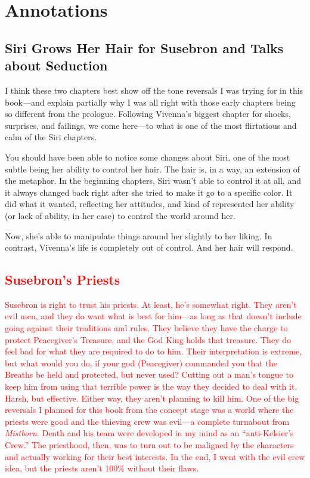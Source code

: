\section*{Annotations}

\subsection*{Siri Grows Her Hair for Susebron and Talks about Seduction}

I think these two chapters best show off the tone reversals I was trying for in this book—and explain partially why I was all right with those early chapters being so different from the prologue. Following Vivenna’s biggest chapter for shocks, surprises, and failings, we come here—to what is one of the most flirtatious and calm of the Siri chapters.

You should have been able to notice some changes about Siri, one of the most subtle being her ability to control her hair. The hair is, in a way, an extension of the metaphor. In the beginning chapters, Siri wasn’t able to control it at all, and it always changed back right after she tried to make it go to a specific color. It did what it wanted, reflecting her attitudes, and kind of represented her ability (or lack of ability, in her case) to control the world around her.

Now, she’s able to manipulate things around her slightly to her liking. In contrast, Vivenna’s life is completely out of control. And her hair will respond.

\textcolor{red}{
\subsection*{Susebron’s Priests}
}
\textcolor{red}{
Susebron is right to trust his priests. At least, he’s somewhat right. They aren’t evil men, and they do want what is best for him—as long as that doesn’t include going against their traditions and rules. They believe they have the charge to protect Peacegiver’s Treasure, and the God King holds that treasure. They do feel bad for what they are required to do to him.
}
\textcolor{red}{
Their interpretation is extreme, but what would you do, if your god (Peacegiver) commanded you that the Breaths be held and protected, but never used? Cutting out a man’s tongue to keep him from using that terrible power is the way they decided to deal with it. Harsh, but effective.
}
\textcolor{red}{
Either way, they aren’t planning to kill him. One of the big reversals I planned for this book from the concept stage was a world where the priests were good and the thieving crew was evil—a complete turnabout from \textit{Mistborn}. Denth and his team were developed in my mind as an “anti-Kelsier’s Crew.” The priesthood, then, was to turn out to be maligned by the characters and actually working for their best interests.
}
\textcolor{red}{
In the end, I went with the evil crew idea, but the priests aren’t 100\% without their flaws.
}

